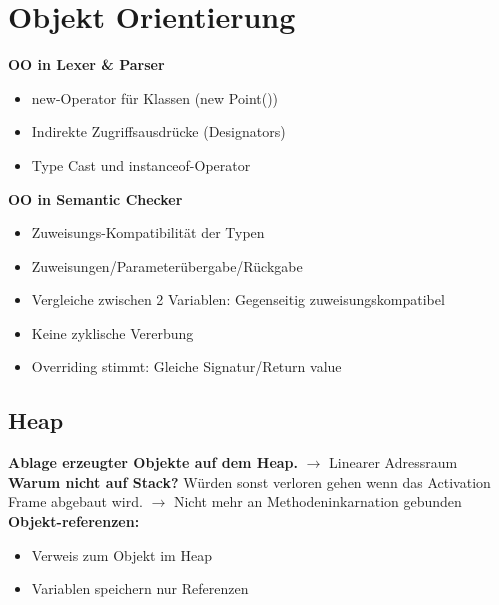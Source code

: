 
\section{Objekt Orientierung}
\begin{minipage}{0.4\linewidth}
    \textbf{OO in Lexer \& Parser}
    \begin{itemize}[topsep=0pt]
        \itemsep -0.2em
        \item new-Operator für Klassen (new Point())
        \item Indirekte Zugriffsausdrücke (Designators)
        \item Type Cast und instanceof-Operator
    \end{itemize}
\end{minipage}
\begin{minipage}{0.6\linewidth}
    \textbf{OO in Semantic Checker}
    \begin{itemize}[topsep=0pt]
        \itemsep -0.2em
        \item Zuweisungs-Kompatibilität der Typen
        \item Zuweisungen/Parameterübergabe/Rückgabe
        \item Vergleiche zwischen 2 Variablen: Gegenseitig zuweisungskompatibel
        \item Keine zyklische Vererbung
        \item Overriding stimmt: Gleiche Signatur/Return value
    \end{itemize}
\end{minipage}

\subsection{Heap}
\textbf{Ablage erzeugter Objekte auf dem Heap.} $\rightarrow$ Linearer Adressraum\\
\textbf{Warum nicht auf Stack?} Würden sonst verloren gehen wenn das Activation Frame abgebaut wird. $\rightarrow$ Nicht mehr an Methodeninkarnation gebunden\\
\textbf{Objekt-referenzen:}
\begin{itemize}[topsep=0pt]
    \itemsep -0.2em
    \item Verweis zum Objekt im Heap
    \item Variablen speichern nur Referenzen
\end{itemize}
